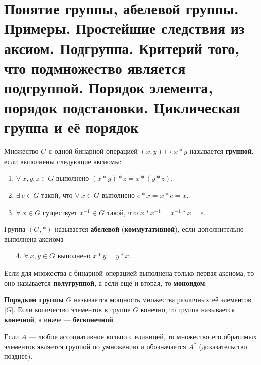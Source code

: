 \section{Понятие группы, абелевой группы. Примеры. Простейшие следствия из аксиом. Подгруппа. Критерий того, что подмножество является подгруппой. Порядок элемента, порядок подстановки. Циклическая группа и её порядок}

\begin{definition}
    Множество $G$ с одной бинарной операцией $(x, y) \mapsto x \ast y$ называется \textbf{группой}, если выполнены следующие аксиомы:
    \begin{enumerate}[nolistsep]
        \item $\forall\!\:x, y, z \in G$ выполнено $(x \ast y) \ast z = x \ast (y \ast z)$.
        \item $\exists\!\:e \in G$ такой, что $\forall\!\:x \in G$ выполнено $e \ast x = x \ast e = x$.
        \item $\forall\!\:x \in G$ существует $x^{-1} \in G$ такой, что $x \ast x^{-1} = x^{-1} \ast x = e$.
    \end{enumerate}
\end{definition}

\begin{definition}
    Группа $(G, \ast)$ называется \textbf{абелевой} (\textbf{коммутативной}), если дополнительно выполнена аксиома
    \begin{enumerate}[nolistsep]
        \item[4.] $\forall\!\:x, y \in G$ выполнено $x \ast y = y \ast x$.
    \end{enumerate}
\end{definition}

\begin{definition}
    Если для множества с бинарной операцией выполнена только первая аксиома, то оно называется \textbf{полугруппой}, а если ещё и вторая, то \textbf{моноидом}.
\end{definition}

\begin{definition}
    \textbf{Порядком группы} $G$ называется мощность множества различных её элементов $|G|$. Если количество элементов в группе $G$ конечно, то группа называется \textbf{конечной}, а иначе --- \textbf{бесконечной}.
\end{definition}

\begin{remark}
    Если $A$ --- любое ассоциативное кольцо с единицей, то множество его обратимых элементов является группой по умножению и обозначается $A^\ast$ (доказательство позднее).
\end{remark}

